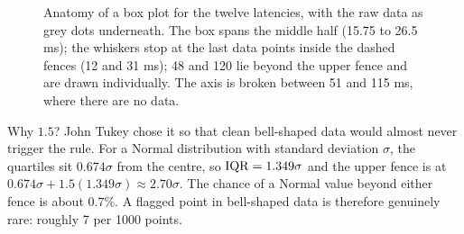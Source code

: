 \begin{figure}[H]
\caption{Anatomy of a box plot for the twelve latencies, with the raw data as grey dots
underneath. The box spans the middle half (15.75 to 26.5 ms); the whiskers stop at the last
data points inside the dashed fences (12 and 31 ms); 48 and 120 lie beyond the upper fence and
are drawn individually. The axis is broken between 51 and 115 ms, where there are no data.}
\label{fig:quantiles-box-anatomy}
\end{figure}

\begin{whybox}
Why $1.5$? John Tukey chose it so that clean bell-shaped data would almost never
trigger the rule. For a Normal distribution with standard deviation $\sigma$, the
quartiles sit $0.674\sigma$ from the centre, so $\operatorname{IQR} = 1.349\sigma$ and the upper fence
is at $0.674\sigma + 1.5(1.349\sigma) \approx 2.70\sigma$. The chance of a Normal value
beyond either fence is about $0.7\%$. A flagged point in bell-shaped data is therefore
genuinely rare: roughly 7 per 1000 points.
\end{whybox}

